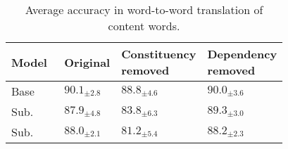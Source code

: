 \begin{table}[t]
    \centering
    \small
    \begin{tabular}{p{0.23\linewidth}p{0.17\linewidth}p{0.19\linewidth}p{0.19\linewidth}}\toprule
    Model & Original & Constituency removed & Dependency removed \\\midrule
    Base & $90.1_{\pm 2.8}$ & $88.8_{\pm 4.6}$ & $90.0_{\pm 3.6}$\\
    \dobjppiobjpp{} Sub. & $87.9_{\pm 4.8}$ & $83.8_{\pm 6.3}$ & $89.3_{\pm 3.0}$\\ 
    \dobjppsubjpp{} Sub. & $88.0_{\pm 2.1}$ & $81.2_{\pm5.4}$ & $88.2_{\pm 2.3}$ \\
    \bottomrule
    \end{tabular}
    \caption{Average accuracy in word-to-word translation of content words.}
    \label{tab:results_word}
\end{table}